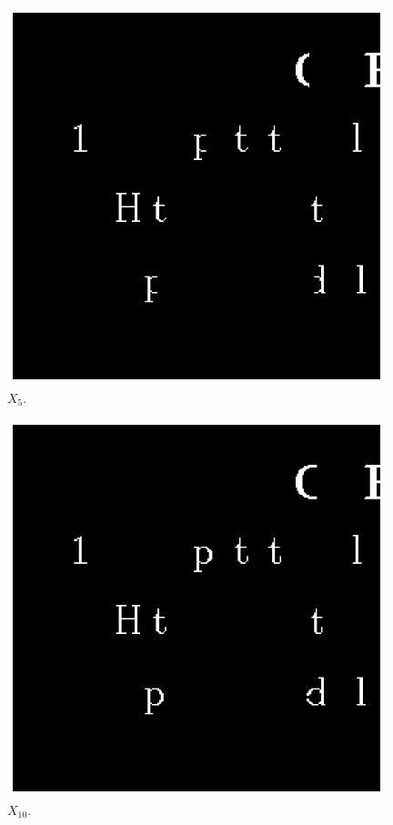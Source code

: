 \documentclass[paper=a4, fontsize=11pt]{scrartcl}
\begin{document}
\begin{figure}
	\centering
	\includegraphics[width=11cm]{Q1_X5.eps}
	\caption{$X_5$.}
	\label{fig:3}
\end{figure}

\begin{figure}
	\centering
	\includegraphics[width=11cm]{Q1_X10.eps}
	\caption{$X_{10}$.}
	\label{fig:4}
\end{figure}
\end{document}

